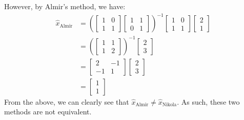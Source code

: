 \documentclass[12pt]{exam}
\begin{document}
\begin{questions}
\begin{solution}
\begin{enumerate}[label=(\alph*)]
      However, by Almir's method, we have:
      \begin{align*}
        \hat{x}_{\text{Almir}} &=
          \left(
            \begin{bmatrix}
              1 & 0 \\
              1 & 1
            \end{bmatrix}
            \begin{bmatrix}
              1 & 1 \\
              0 & 1
            \end{bmatrix}
          \right)^{-1}
            \begin{bmatrix}
              1 & 0 \\
              1 & 1
            \end{bmatrix}
            \begin{bmatrix}
              2 \\
              1
            \end{bmatrix} \\
          &= \left(
            \begin{bmatrix}
              1 & 1 \\
              1 & 2
            \end{bmatrix}
          \right)^{-1}
          \begin{bmatrix}
            2 \\
            3
          \end{bmatrix} \\
          &=
            \begin{bmatrix}
              2 & -1 \\
              -1 & 1
            \end{bmatrix}
            \begin{bmatrix}
            2 \\
            3
          \end{bmatrix} \\
        &= \begin{bmatrix}
            1 \\
            1
           \end{bmatrix}
      \end{align*}
      From the above, we can clearly see that $\hat{x}_{\text{Almir}} \neq \hat{x}_{\text{Nikola}}$. As such, these two methods are not equivalent.



\end{enumerate}
\end{solution}
\end{questions}
\end{document}

